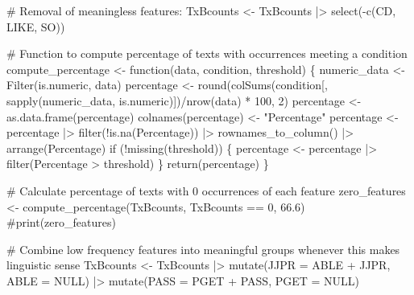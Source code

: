 \documentclass[
  letterpaper,
  DIV=11,
  numbers=noendperiod]{scrreprt}
\newenvironment{Shaded}{\begin{snugshade}}{\end{snugshade}}
\newcommand{\AttributeTok}[1]{\textcolor[rgb]{0.40,0.45,0.13}{#1}}
\newcommand{\CommentTok}[1]{\textcolor[rgb]{0.37,0.37,0.37}{#1}}
\newcommand{\ConstantTok}[1]{\textcolor[rgb]{0.56,0.35,0.01}{#1}}
\newcommand{\ControlFlowTok}[1]{\textcolor[rgb]{0.00,0.23,0.31}{#1}}
\newcommand{\DecValTok}[1]{\textcolor[rgb]{0.68,0.00,0.00}{#1}}
\newcommand{\FloatTok}[1]{\textcolor[rgb]{0.68,0.00,0.00}{#1}}
\newcommand{\FunctionTok}[1]{\textcolor[rgb]{0.28,0.35,0.67}{#1}}
\newcommand{\NormalTok}[1]{\textcolor[rgb]{0.00,0.23,0.31}{#1}}
\newcommand{\OtherTok}[1]{\textcolor[rgb]{0.00,0.23,0.31}{#1}}
\newcommand{\SpecialCharTok}[1]{\textcolor[rgb]{0.37,0.37,0.37}{#1}}
\newcommand{\StringTok}[1]{\textcolor[rgb]{0.13,0.47,0.30}{#1}}
\begin{document}
\begin{Shaded}
\begin{Highlighting}[]
\CommentTok{\# Removal of meaningless features:}
\NormalTok{TxBcounts }\OtherTok{\textless{}{-}}\NormalTok{ TxBcounts }\SpecialCharTok{|\textgreater{}}  
  \FunctionTok{select}\NormalTok{(}\SpecialCharTok{{-}}\FunctionTok{c}\NormalTok{(CD, LIKE, SO))}

\CommentTok{\# Function to compute percentage of texts with occurrences meeting a condition}
\NormalTok{compute\_percentage }\OtherTok{\textless{}{-}} \ControlFlowTok{function}\NormalTok{(data, condition, threshold) \{}
\NormalTok{  numeric\_data }\OtherTok{\textless{}{-}} \FunctionTok{Filter}\NormalTok{(is.numeric, data)}
\NormalTok{  percentage }\OtherTok{\textless{}{-}} \FunctionTok{round}\NormalTok{(}\FunctionTok{colSums}\NormalTok{(condition[, }\FunctionTok{sapply}\NormalTok{(numeric\_data, is.numeric)])}\SpecialCharTok{/}\FunctionTok{nrow}\NormalTok{(data) }\SpecialCharTok{*} \DecValTok{100}\NormalTok{, }\DecValTok{2}\NormalTok{)}
\NormalTok{  percentage }\OtherTok{\textless{}{-}} \FunctionTok{as.data.frame}\NormalTok{(percentage)}
  \FunctionTok{colnames}\NormalTok{(percentage) }\OtherTok{\textless{}{-}} \StringTok{"Percentage"}
\NormalTok{  percentage }\OtherTok{\textless{}{-}}\NormalTok{ percentage }\SpecialCharTok{|\textgreater{}}  
    \FunctionTok{filter}\NormalTok{(}\SpecialCharTok{!}\FunctionTok{is.na}\NormalTok{(Percentage)) }\SpecialCharTok{|\textgreater{}} 
    \FunctionTok{rownames\_to\_column}\NormalTok{() }\SpecialCharTok{|\textgreater{}} 
    \FunctionTok{arrange}\NormalTok{(Percentage)}
  \ControlFlowTok{if}\NormalTok{ (}\SpecialCharTok{!}\FunctionTok{missing}\NormalTok{(threshold)) \{}
\NormalTok{    percentage }\OtherTok{\textless{}{-}}\NormalTok{ percentage }\SpecialCharTok{|\textgreater{}}  
      \FunctionTok{filter}\NormalTok{(Percentage }\SpecialCharTok{\textgreater{}}\NormalTok{ threshold)}
\NormalTok{  \}}
  \FunctionTok{return}\NormalTok{(percentage)}
\NormalTok{\}}

\CommentTok{\# Calculate percentage of texts with 0 occurrences of each feature}
\NormalTok{zero\_features }\OtherTok{\textless{}{-}} \FunctionTok{compute\_percentage}\NormalTok{(TxBcounts, TxBcounts }\SpecialCharTok{==} \DecValTok{0}\NormalTok{, }\FloatTok{66.6}\NormalTok{)}
\CommentTok{\#print(zero\_features)}

\CommentTok{\# Combine low frequency features into meaningful groups whenever this makes linguistic sense}
\NormalTok{TxBcounts }\OtherTok{\textless{}{-}}\NormalTok{ TxBcounts }\SpecialCharTok{|\textgreater{}}  
  \FunctionTok{mutate}\NormalTok{(}\AttributeTok{JJPR =}\NormalTok{ ABLE }\SpecialCharTok{+}\NormalTok{ JJPR, }\AttributeTok{ABLE =} \ConstantTok{NULL}\NormalTok{) }\SpecialCharTok{|\textgreater{}}  
  \FunctionTok{mutate}\NormalTok{(}\AttributeTok{PASS =}\NormalTok{ PGET }\SpecialCharTok{+}\NormalTok{ PASS, }\AttributeTok{PGET =} \ConstantTok{NULL}\NormalTok{)}


\end{Highlighting}
\end{Shaded}
\end{document}
